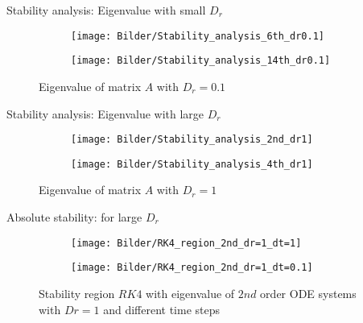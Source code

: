 \begin{frame}{Stability analysis: Eigenvalue with small $D_r$}
	\begin{figure}
		\begin{subfigure}{0.48\textwidth}
			\texttt{[image: Bilder/Stability\_analysis\_6th\_dr0.1]}
		\end{subfigure}
		\hfill
		\begin{subfigure}{0.48\textwidth}
			\texttt{[image: Bilder/Stability\_analysis\_14th\_dr0.1]}
		\end{subfigure}
		\caption{Eigenvalue of matrix $A$ with $D_r = 0.1$}
	\end{figure}
\end{frame}

\begin{frame}{Stability analysis: Eigenvalue with large $D_r$}
	\begin{figure}
		\begin{subfigure}{0.48\textwidth}
			\texttt{[image: Bilder/Stability\_analysis\_2nd\_dr1]}
		\end{subfigure}
		\hfill
		\begin{subfigure}{0.48\textwidth}
			\texttt{[image: Bilder/Stability\_analysis\_4th\_dr1]}
		\end{subfigure}
		\caption{Eigenvalue of matrix $A$ with $D_r = 1$}
	\end{figure}
\end{frame}

\begin{frame}{Absolute stability: for large $D_r$}
	\begin{figure}
		\begin{subfigure}{0.48\textwidth}
			\texttt{[image: Bilder/RK4\_region\_2nd\_dr=1\_dt=1]}
		\end{subfigure}
		\hfill
		\begin{subfigure}{0.48\textwidth}
			\texttt{[image: Bilder/RK4\_region\_2nd\_dr=1\_dt=0.1]}
		\end{subfigure}
		\caption{Stability region $RK4$ with eigenvalue of $2nd$ order ODE systems with $Dr=1$ and different time steps}
	\end{figure}
\end{frame}

